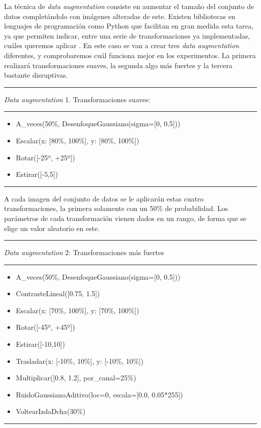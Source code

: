 La técnica de \textit{data augmentation} consiste en aumentar el tamaño del conjunto de datos completándolo con imágenes alteradas de este. Existen bibliotecas en lenguajes de programación como Python que facilitan en gran medida esta tarea, ya que permiten indicar, entre una serie de transformaciones ya implementadas, cuáles queremos aplicar \cite{imgaug}. En este caso se van a crear tres \textit{data augmentation} diferentes, y comprobaremos cuál funciona mejor en los experimentos. La primera realizará transformaciones suaves, la segunda algo más fuertes y la tercera bastante disruptivas.

\noindent\rule{\textwidth}{1pt}
\noindent\textit{Data augmentation} 1. Transformaciones suaves:
\vspace{-0.2cm}
\\\noindent\rule{\textwidth}{1pt}
\begin{itemize}
    \item A\_veces(50\%, DesenfoqueGaussiano(sigma=[0, 0.5]))
    \item Escalar(x: [80\%, 100\%], y: [80\%, 100\%])
    \item Rotar([-25º, +25º])
    \item Estirar([-5,5])
\end{itemize}
\vspace{-0.3cm}
\noindent\rule{\textwidth}{1pt}


A cada imagen del conjunto de datos se le aplicarán estas cuatro transformaciones, la primera solamente con un 50\% de probabilidad. Los parámetros de cada transformación vienen dados en un rango, de forma que se elige un valor aleatorio en este.

\noindent\rule{\textwidth}{1pt}
\noindent\textit{Data augmentation} 2: Transformaciones más fuertes
\vspace{-0.2cm}
\\\noindent\rule{\textwidth}{1pt}
\begin{itemize}
    \item A\_veces(50\%, DesenfoqueGaussiano(sigma=[0, 0.5]))
    \item ContrasteLineal([0.75, 1.5])
    \item Escalar(x: [70\%, 100\%], y: [70\%, 100\%])
    \item Rotar([-45º, +45º])
    \item Estirar([-10,10])
    \item Trasladar(x: [-10\%, 10\%], y: [-10\%, 10\%])
    \item Multiplicar([0.8, 1.2], por\_canal=25\%)
    \item RuidoGaussianoAditivo(loc=0, escala=[0.0, 0.05*255])
    \item VoltearIzdaDcha(30\%)
\end{itemize}
\vspace{-0.3cm}
\noindent\rule{\textwidth}{1pt}


